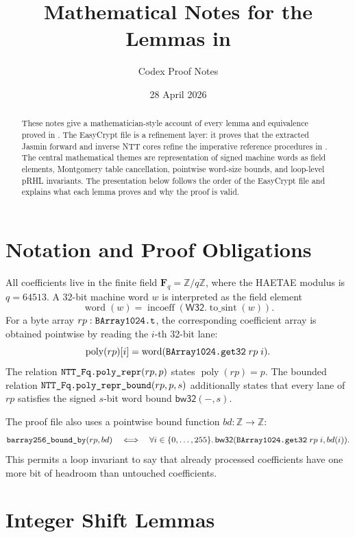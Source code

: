 \documentclass[11pt]{article}
\title{Mathematical Notes for the Lemmas in \texorpdfstring{\code{RefJasminNTT.ec}}{RefJasminNTT.ec}}
\author{Codex Proof Notes}
\date{28 April 2026}
\newcommand{\code}[1]{\texttt{\detokenize{#1}}}
\newcommand{\Fq}{\mathbf{F}_q}
\newcommand{\Z}{\mathbb{Z}}
\newcommand{\Rq}{\mathbb{Z}/q\mathbb{Z}}
\newcommand{\Range}[2]{\{#1,\ldots,#2\}}
\newcommand{\W}{\mathsf{W32}}
\newcommand{\bw}{\mathsf{bw32}}
\begin{document}
\maketitle

\begin{abstract}
These notes give a mathematician-style account of every lemma and equivalence
proved in \code{RefJasminNTT.ec}.  The EasyCrypt file is a refinement layer:
it proves that the extracted Jasmin forward and inverse NTT cores refine the
imperative reference procedures in \code{NTT_Fq.NTT}.  The central mathematical
themes are representation of signed machine words as field elements, Montgomery
table cancellation, pointwise word-size bounds, and loop-level pRHL invariants.
The presentation below follows the order of the EasyCrypt file and explains
what each lemma proves and why the proof is valid.
\end{abstract}

\tableofcontents

\section{Notation and Proof Obligations}

All coefficients live in the finite field \(\Fq=\Rq\), where the HAETAE
modulus is \(q=64513\).  A 32-bit machine word \(w\) is interpreted as the
field element
\[
  \operatorname{word}(w)=\operatorname{incoeff}(\W.\operatorname{to\_sint}(w)).
\]
For a byte array \(rp:\code{BArray1024.t}\), the corresponding coefficient
array is obtained pointwise by reading the \(i\)-th 32-bit lane:
\[
  \operatorname{poly}(rp)[i]
  =
  \operatorname{word}(\code{BArray1024.get32}\;rp\;i).
\]
The relation \(\code{NTT_Fq.poly_repr}(rp,p)\) states
\(\operatorname{poly}(rp)=p\).  The bounded relation
\(\code{NTT_Fq.poly_repr_bound}(rp,p,s)\) additionally states that every lane
of \(rp\) satisfies the signed \(s\)-bit word bound \(\bw(-,s)\).

The proof file also uses a pointwise bound function \(bd:\Z\to\Z\):
\[
  \code{barray256_bound_by}(rp,bd)
  \quad\Longleftrightarrow\quad
  \forall i\in\Range{0}{255}.\,
    \bw(\code{BArray1024.get32}\;rp\;i,bd(i)).
\]
This permits a loop invariant to say that already processed coefficients have
one more bit of headroom than untouched coefficients.

\section{Integer Shift Lemmas}
\end{document}

